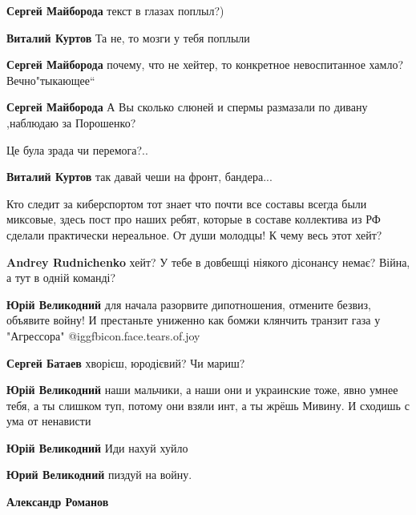 \begin{itemize}
\begin{itemize}
\begin{itemize} %
\textbf{Сергей Майборода} текст в глазах поплыл?)

\textbf{Виталий Куртов} Та не, то мозги у тебя поплыли

\textbf{Сергей Майборода} почему, что не хейтер, то конкретное невоспитанное хамло? Вечно"тыкающее“

\textbf{Сергей Майборода} А Вы сколько слюней и спермы размазали по дивану ,наблюдаю за Порошенко?
\end{itemize} %

Це була зрада чи перемога?..

\textbf{Виталий Куртов} так давай чеши на фронт, бандера...

\end{itemize} %


Кто следит за киберспортом тот знает что почти все составы всегда были
миксовые, здесь пост про наших ребят, которые в составе коллектива из РФ
сделали практически нереальное. От души молодцы! К чему весь этот хейт?

\begin{itemize} %
\textbf{Andrey Rudnichenko} хейт? У тебе в довбешці ніякого дісонансу немає? Війна, а тут в одній команді?

\begin{itemize} %
\textbf{Юрій Великодний} для начала разорвите дипотношения, отмените безвиз, объявите войну! И престаньте униженно как бомжи клянчить транзит газа у "Агрессора" @igg{fbicon.face.tears.of.joy} 

\textbf{Сергей Батаев} хворієш, юродієвий? Чи мариш?

\textbf{Юрій Великодний} наши мальчики, а наши они и украинские тоже, явно умнее тебя, а ты слишком туп, потому они взяли инт, а ты жрёшь Мивину. И сходишь с ума от ненависти

\textbf{Юрій Великодний}
Иди нахуй хуйло
\end{itemize} %

\textbf{Юрий Великодний} пиздуй на войну.

\begin{itemize} %
\textbf{Александр Романов}


\end{itemize}
\end{itemize}
\end{itemize}
